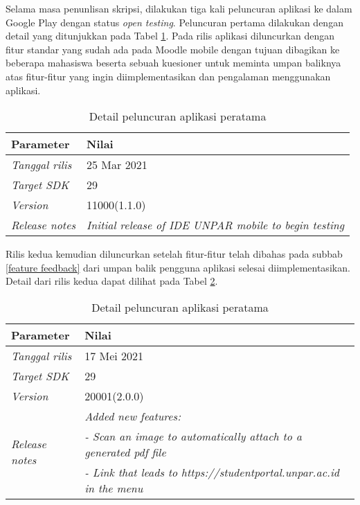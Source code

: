 Selama masa penunlisan skripsi, dilakukan tiga kali peluncuran aplikasi ke dalam Google Play dengan status \textit{open testing}. Peluncuran pertama dilakukan dengan detail yang ditunjukkan pada Tabel \ref{app:release:first}. Pada rilis aplikasi diluncurkan dengan fitur standar yang sudah ada pada Moodle mobile dengan tujuan dibagikan ke beberapa mahasiswa beserta sebuah kuesioner untuk meminta umpan baliknya atas fitur-fitur yang ingin diimplementasikan dan pengalaman menggunakan aplikasi.

\begin{table}[ht]
\caption{Detail peluncuran aplikasi peratama}
\centering
\begin{tabular}{|l | l |}
\hline
\textbf{Parameter} & \textbf{Nilai} \\  \hline
\textit{Tanggal rilis}  &  25 Mar 2021 \\ \hline
\textit{Target SDK} & 29 \\ \hline
\textit{Version} &  11000(1.1.0) \\ \hline
\textit{Release notes} & \textit{Initial release of IDE UNPAR mobile to begin testing} \\ 
\hline
\end{tabular}
\label{app:release:first}
\end{table}

Rilis kedua kemudian diluncurkan setelah fitur-fitur telah dibahas pada subbab \ref{feature feedback} dari umpan balik pengguna aplikasi selesai diimplementasikan. Detail dari rilis kedua dapat dilihat pada Tabel \ref{app:release:second}. 

\begin{table}[H]
\caption{Detail peluncuran aplikasi peratama}
\centering
\begin{tabular}{|l | l |}
\hline
\textbf{Parameter} & \textbf{Nilai} \\  \hline
\textit{Tanggal rilis}  &  17  Mei 2021 \\ \hline
\textit{Target SDK} & 29 \\ \hline
\textit{Version} &  20001(2.0.0) \\ \hline
\multirow{3}{*}{\textit{Release notes}} &  \textit{Added new features:} \\ & \textit{- Scan an image to automatically attach to a generated pdf file}\\ &  \textit{- Link that leads to https://studentportal.unpar.ac.id in the menu} \\ 
\hline
\end{tabular}
\label{app:release:second}
\end{table}

